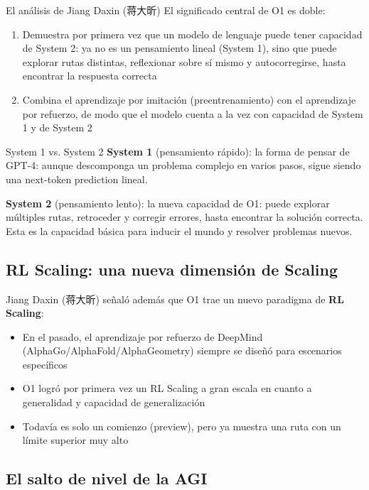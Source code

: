 \documentclass[a4paper]{article}
\begin{document}
\begin{importantbox}{El análisis de Jiang Daxin (蒋大昕)}
El significado central de O1 es doble:
\begin{enumerate}
\item Demuestra por primera vez que un modelo de lenguaje puede tener capacidad de System 2: ya no es un pensamiento lineal (System 1), sino que puede explorar rutas distintas, reflexionar sobre sí mismo y autocorregirse, hasta encontrar la respuesta correcta
\item Combina el aprendizaje por imitación (preentrenamiento) con el aprendizaje por refuerzo, de modo que el modelo cuenta a la vez con capacidad de System 1 y de System 2
\end{enumerate}
\end{importantbox}

\begin{knowledgebox}{System 1 vs. System 2}
\textbf{System 1} (pensamiento rápido): la forma de pensar de GPT-4: aunque descomponga un problema complejo en varios pasos, sigue siendo una next-token prediction lineal.

\textbf{System 2} (pensamiento lento): la nueva capacidad de O1: puede explorar múltiples rutas, retroceder y corregir errores, hasta encontrar la solución correcta. Esta es la capacidad básica para inducir el mundo y resolver problemas nuevos.
\end{knowledgebox}

\subsection{RL Scaling: una nueva dimensión de Scaling}

Jiang Daxin (蒋大昕) señaló además que O1 trae un nuevo paradigma de \textbf{RL Scaling}:

\begin{itemize}
\item En el pasado, el aprendizaje por refuerzo de DeepMind (AlphaGo/AlphaFold/AlphaGeometry) siempre se diseñó para escenarios específicos
\item O1 logró por primera vez un RL Scaling a gran escala en cuanto a generalidad y capacidad de generalización
\item Todavía es solo un comienzo (preview), pero ya muestra una ruta con un límite superior muy alto
\end{itemize}

\subsection{El salto de nivel de la AGI}
\end{document}
